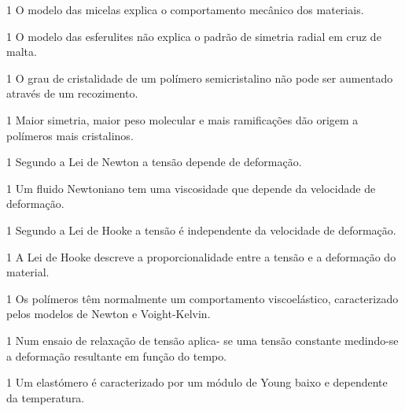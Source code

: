 \documentclass[\mainfilename]{subfiles}
\begin{document}
\begin{questionBox}1{ %
    O modelo das micelas explica o comportamento mecânico dos materiais.
} %
    \AT
\end{questionBox}
\begin{questionBox}1{ %
    O modelo das esferulites não explica o padrão de simetria radial em cruz de malta.
} %
    \AF
\end{questionBox}
\begin{questionBox}1{ %
    O grau de cristalidade de um polímero semicristalino não pode ser aumentado através de um recozimento.
} %
    \AF
\end{questionBox}
\begin{questionBox}1{ %
    Maior simetria, maior peso molecular e mais ramificações dão origem a polímeros mais cristalinos.
} %
    \AF
\end{questionBox}
\begin{questionBox}1{ %
    Segundo a Lei de Newton a tensão depende de deformação.
} %
    \AF
\end{questionBox}
\begin{questionBox}1{ %
    Um fluido Newtoniano tem uma viscosidade que depende da velocidade de deformação.
} %
    \AF
\end{questionBox}
\begin{questionBox}1{ %
    Segundo a Lei de Hooke a tensão é independente da velocidade de deformação.
} %
    \AT
\end{questionBox}
\begin{questionBox}1{ %
    A Lei de Hooke descreve a proporcionalidade entre a tensão e a deformação do material.
} %
    \AT
\end{questionBox}
\begin{questionBox}1{ %
    Os polímeros têm normalmente um comportamento viscoelástico, caracterizado pelos modelos de Newton e Voight-Kelvin.
} %
    \AF
\end{questionBox}
\begin{questionBox}1{ %
    Num ensaio de relaxação de tensão aplica- se uma tensão constante medindo-se a deformação resultante em função do tempo.
} %
    \AF
\end{questionBox}
\begin{questionBox}1{ %
    Um elastómero é caracterizado por um módulo de Young baixo e dependente da temperatura.
} %
    \AT
\end{questionBox}
\end{document}
